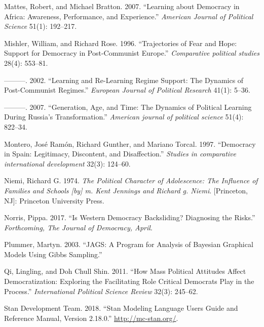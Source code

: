 \documentclass[12pt,english,a4paper,oneside]{article}
\newlength{\cslhangindent}
\newlength{\cslentryspacingunit} %
\newenvironment{CSLReferences}[2] %
 {%
  \setlength{\parindent}{0pt}
  \ifodd #1
  \let\oldpar\par
  \def\par{\hangindent=\cslhangindent\oldpar}
  \fi
  \setlength{\parskip}{#2\cslentryspacingunit}
 }%
 {}
\theoremstyle{definition}
\theoremstyle{definition}
\theoremstyle{definition}
\theoremstyle{definition}
\theoremstyle{remark}
\begin{document}
\begin{CSLReferences}{1}{0}
\leavevmode{}%
Mattes, Robert, and Michael Bratton. 2007. {``Learning about Democracy in Africa: Awareness, Performance, and Experience.''} \emph{American Journal of Political Science} 51(1): 192--217.

\leavevmode{}%
Mishler, William, and Richard Rose. 1996. {``Trajectories of Fear and Hope: Support for Democracy in Post-Communist Europe.''} \emph{Comparative political studies} 28(4): 553--81.

\leavevmode{}%
---------. 2002. {``Learning and Re-Learning Regime Support: The Dynamics of Post-Communist Regimes.''} \emph{European Journal of Political Research} 41(1): 5--36.

\leavevmode{}%
---------. 2007. {``Generation, Age, and Time: The Dynamics of Political Learning During Russia's Transformation.''} \emph{American journal of political science} 51(4): 822--34.

\leavevmode{}%
Montero, José Ramón, Richard Gunther, and Mariano Torcal. 1997. {``Democracy in Spain: Legitimacy, Discontent, and Disaffection.''} \emph{Studies in comparative international development} 32(3): 124--60.

\leavevmode{}%
Niemi, Richard G. 1974. \emph{The Political Character of Adolescence: The Influence of Families and Schools {[}by{]} m. Kent Jennings and Richard g. Niemi}. {[}Princeton, NJ{]}: Princeton University Press.

\leavevmode{}%
Norris, Pippa. 2017. {``Is Western Democracy Backsliding? Diagnosing the Risks.''} \emph{Forthcoming, The Journal of Democracy, April}.

\leavevmode{}%
Plummer, Martyn. 2003. {``JAGS: A Program for Analysis of Bayesian Graphical Models Using Gibbs Sampling.''}

\leavevmode{}%
Qi, Lingling, and Doh Chull Shin. 2011. {``How Mass Political Attitudes Affect Democratization: Exploring the Facilitating Role Critical Democrats Play in the Process.''} \emph{International Political Science Review} 32(3): 245--62.

\leavevmode{}%
Stan Development Team. 2018. {``Stan Modeling Language Users Guide and Reference Manual, Version 2.18.0.''} \url{http://mc-stan.org/}.


\end{CSLReferences}
\end{document}

